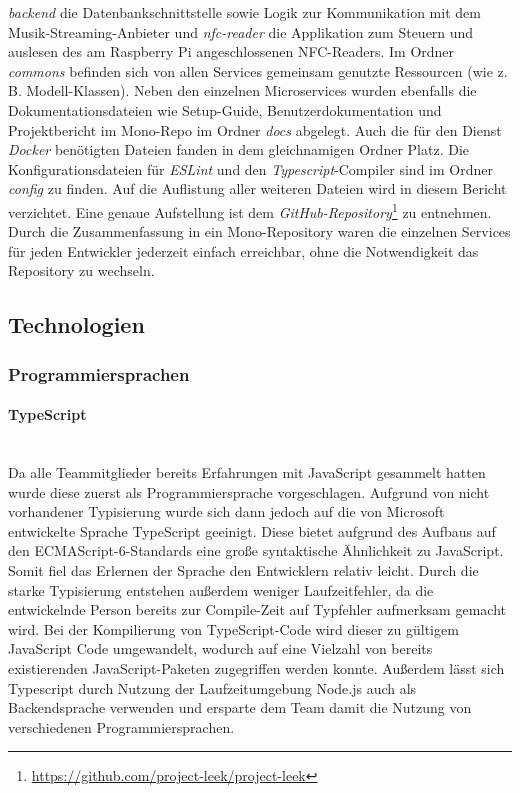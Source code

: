 \documentclass[10pt, a4paper]{article}
\begin{document}
\textit{backend} die Datenbankschnittstelle sowie Logik zur Kommunikation mit dem Musik-Streaming-Anbieter und \textit{nfc-reader} die Applikation zum Steuern und auslesen des am Raspberry Pi angeschlossenen NFC-Readers.
Im Ordner \textit{commons} befinden sich von allen Services gemeinsam genutzte Ressourcen (wie z. B. Modell-Klassen).
Neben den einzelnen Microservices wurden ebenfalls die Dokumentationsdateien wie Setup-Guide, Benutzerdokumentation und Projektbericht im Mono-Repo im Ordner \textit{docs} abgelegt.
Auch die für den Dienst \textit{Docker} benötigten Dateien fanden in dem gleichnamigen Ordner Platz. Die Konfigurationsdateien für \textit{ESLint} und den \textit{Typescript}-Compiler sind im Ordner \textit{config} zu finden.
Auf die Auflistung aller weiteren Dateien wird in diesem Bericht verzichtet. Eine genaue Aufstellung ist dem \textit{GitHub-Repository}\footnote{\url{https://github.com/project-leek/project-leek}} zu entnehmen.
Durch die Zusammenfassung in ein Mono-Repository waren die einzelnen Services für jeden Entwickler jederzeit einfach erreichbar, ohne die Notwendigkeit das Repository zu wechseln.

\subsection{Technologien}
\label{technologien}

\subsubsection{Programmiersprachen}

\paragraph*{TypeScript} $~$ \\
Da alle Teammitglieder bereits Erfahrungen mit JavaScript gesammelt hatten wurde diese zuerst als Programmiersprache vorgeschlagen.
Aufgrund von nicht vorhandener Typisierung wurde sich dann jedoch auf die von Microsoft entwickelte Sprache TypeScript geeinigt. Diese bietet aufgrund des
Aufbaus auf den ECMAScript-6-Standards eine große syntaktische Ähnlichkeit zu JavaScript. Somit fiel das Erlernen der Sprache den Entwicklern relativ leicht.
Durch die starke Typisierung entstehen außerdem weniger Laufzeitfehler, da die entwickelnde Person bereits zur Compile-Zeit auf Typfehler aufmerksam gemacht wird.\cite{Typescript_Typisierung}
Bei der Kompilierung von TypeScript-Code wird dieser zu gültigem JavaScript Code umgewandelt, wodurch auf eine Vielzahl von bereits existierenden JavaScript-Paketen zugegriffen werden konnte.
Außerdem lässt sich Typescript durch Nutzung der Laufzeitumgebung Node.js auch als Backendsprache verwenden und ersparte dem Team damit die Nutzung von verschiedenen Programmiersprachen.
\end{document}
